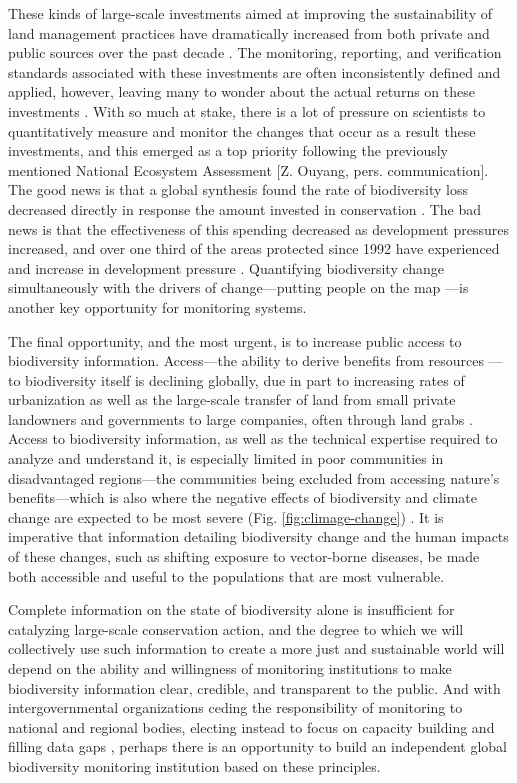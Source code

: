 These kinds of large-scale investments aimed at improving the sustainability of land management practices have dramatically increased from both private and public sources over the past decade \cite{hamrick2016state}. The monitoring, reporting, and verification standards associated with these investments are often inconsistently defined and applied, however, leaving many to wonder about the actual returns on these investments \cite{Ferraro2006-gj, Engel2008-bq, Sexton2016-vb}. With so much at stake, there is a lot of pressure on scientists to quantitatively measure and monitor the changes that occur as a result these investments, and this emerged as a top priority following the previously mentioned National Ecosystem Assessment [Z. Ouyang, pers. communication]. The good news is that a global synthesis found the rate of biodiversity loss decreased directly in response the amount invested in conservation \cite{Waldron2017-ct}. The bad news is that the effectiveness of this spending decreased as development pressures increased, and over one third of the areas protected since 1992 have experienced and increase in development pressure \cite{Jones2018-uv}. Quantifying biodiversity change simultaneously with the drivers of change—putting people on the map \cite{Ellis2008-xj}—is another key opportunity for monitoring systems.

The final opportunity, and the most urgent, is to increase public access to biodiversity information. Access—the ability to derive benefits from resources \cite{Ribot2009-wm}—to biodiversity itself is declining globally, due in part to increasing rates of urbanization \cite{United_Nations_Population_Division_undated-nr, Bratman2019-hi} as well as the large-scale transfer of land from small private landowners and governments to large companies, often through land grabs \cite{Peluso2011-rl, Borras2012-gr, Wolford2013-vh}. Access to biodiversity information, as well as the technical expertise required to analyze and understand it, is especially limited in poor communities in disadvantaged regions—the communities being excluded from accessing nature's benefits—which is also where the negative effects of biodiversity and climate change are expected to be most severe (Fig. \ref{fig:climage-change}) \cite{Borras2012-or, Richardson2016-lq, Barbier2018-nw, IPBES2019-hl}. It is imperative that information detailing biodiversity change and the human impacts of these changes, such as shifting exposure to vector-borne diseases, be made both accessible and useful to the populations that are most vulnerable.

Complete information on the state of biodiversity alone is insufficient for catalyzing large-scale conservation action, and the degree to which we will collectively use such information to create a more just and sustainable world will depend on the ability and willingness of monitoring institutions to make biodiversity information clear, credible, and transparent to the public. And with intergovernmental organizations ceding the responsibility of monitoring to national and regional bodies, electing instead to focus on capacity building and filling data gaps \cite{Larigauderie2010-rp, Scholes2012-ec}, perhaps there is an opportunity to build an independent global biodiversity monitoring institution based on these principles.